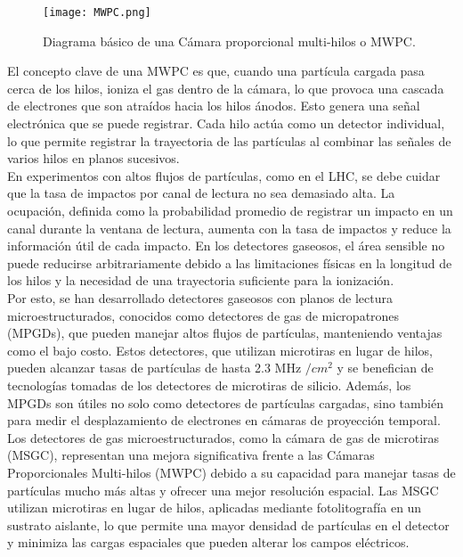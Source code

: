 \documentclass[]{book}
\begin{document}
\begin{figure}[H]
    \centering
    \texttt{[image: MWPC.png]}
    \caption{Diagrama básico de una Cámara proporcional multi-hilos o MWPC.}
    \label{fig:MWPC}
\end{figure}


\noindent El concepto clave de una MWPC es que, cuando una partícula cargada pasa cerca de los hilos, ioniza el gas dentro de la cámara, lo que provoca una cascada de electrones que son atraídos hacia los hilos ánodos. Esto genera una señal electrónica que se puede registrar. Cada hilo actúa como un detector individual, lo que permite registrar la trayectoria de las partículas al combinar las señales de varios hilos en planos sucesivos.\\

\noindent En experimentos con altos flujos de partículas, como en el LHC, se debe cuidar que la tasa de impactos por canal de lectura no sea demasiado alta. La ocupación, definida como la probabilidad promedio de registrar un impacto en un canal durante la ventana de lectura, aumenta con la tasa de impactos y reduce la información útil de cada impacto. En los detectores gaseosos, el área sensible no puede reducirse arbitrariamente debido a las limitaciones físicas en la longitud de los hilos y la necesidad de una trayectoria suficiente para la ionización.\\

\noindent Por esto, se han desarrollado detectores gaseosos con planos de lectura microestructurados, conocidos como detectores de gas de micropatrones (MPGDs), que pueden manejar altos flujos de partículas, manteniendo ventajas como el bajo costo. Estos detectores, que utilizan microtiras en lugar de hilos, pueden alcanzar tasas de partículas de hasta 2.3 MHz $/cm^{2}$ y se benefician de tecnologías tomadas de los detectores de microtiras de silicio. Además, los MPGDs son útiles no solo como detectores de partículas cargadas, sino también para medir el desplazamiento de electrones en cámaras de proyección temporal.\\

\noindent Los detectores de gas microestructurados, como la cámara de gas de microtiras (MSGC), representan una mejora significativa frente a las Cámaras Proporcionales Multi-hilos (MWPC) debido a su capacidad para manejar tasas de partículas mucho más altas y ofrecer una mejor resolución espacial. Las MSGC utilizan microtiras en lugar de hilos, aplicadas mediante fotolitografía en un sustrato aislante, lo que permite una mayor densidad de partículas en el detector y minimiza las cargas espaciales que pueden alterar los campos eléctricos.\\
\end{document}
